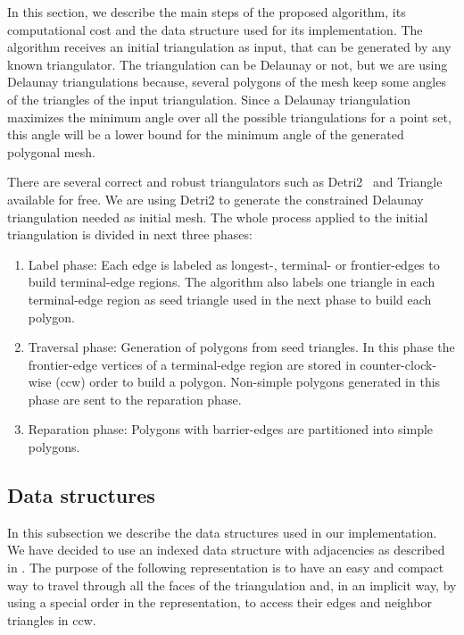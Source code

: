 \documentclass[lineno,pdflatex,sn-mathphys]{sn-jnl}%
\theoremstyle{thmstyleone}%
\theoremstyle{thmstyletwo}%
\theoremstyle{thmstylethree}%
\begin{document}

In this section, we describe  the main steps of the proposed algorithm, its computational cost  and the data structure used for its implementation.
The algorithm receives an initial triangulation as input, that can be generated by any known triangulator. The triangulation can be Delaunay or not, but we are using Delaunay triangulations because, several polygons of the mesh keep some angles of the triangles of the input triangulation. Since a Delaunay triangulation maximizes the minimum angle over all the possible triangulations for a point set, this angle will be a lower bound for the minimum angle of the generated polygonal mesh.

There are  several correct and robust triangulators such as Detri2~\cite{Detri2} and Triangle~\cite{triangle2d} available for free.  We are using Detri2 \cite{Detri2} to generate the constrained Delaunay triangulation needed as initial mesh. The whole process applied to the initial triangulation is divided in next three phases:


\begin{enumerate}[label=\roman*)]
    \item Label phase: Each edge is labeled as  longest-, terminal- or frontier-edges to  build terminal-edge regions. The algorithm also labels one  triangle in each terminal-edge region as seed triangle used in the next phase to build each polygon.
    \item Traversal phase: Generation of polygons from seed triangles. In this phase the frontier-edge vertices of a terminal-edge region are stored in counter-clock-wise (ccw) order to  build a polygon. Non-simple polygons generated in this phase are sent to the reparation phase.
    \item Reparation phase: Polygons with barrier-edges are partitioned into simple polygons.
\end{enumerate}


\subsection{Data structures}
\label{sec:datastructrue}
In this subsection we describe the data structures used in our implementation. We have decided to use an indexed data structure with adjacencies as  described in \cite{MeshDatastructSurvey}.  The purpose of the following representation is to have an easy and compact way to travel through all the faces of the triangulation and, in an implicit way, by using a special order in the representation, to access their edges and neighbor triangles in ccw. 
\end{document}
